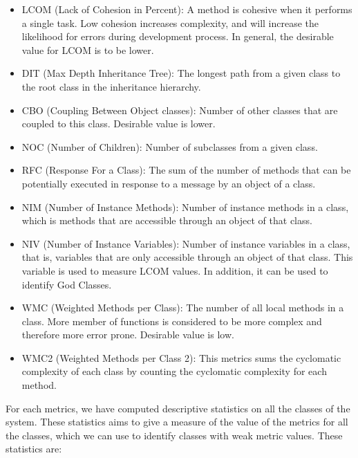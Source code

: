 \begin{itemize}
	\item LCOM (Lack of Cohesion in Percent): A method is cohesive when it performs a single task. Low cohesion increases complexity, and will increase the likelihood for errors during development process. In general, the desirable value for LCOM is to be lower. 

	\item DIT (Max Depth Inheritance Tree): The longest path from a given class to the root class in the inheritance hierarchy.

\item CBO (Coupling Between Object classes): Number of other classes that are coupled to this class. Desirable value is lower. 

\item NOC (Number of Children): Number of subclasses from a given class.

\item RFC (Response For a Class): The sum of the number of methods that can be potentially executed in response to a message by an object of a class.

\item NIM (Number of Instance Methods): Number of instance methods in a class, which is methods that are accessible through an object of that class.

\item NIV (Number of Instance Variables): Number of instance variables in a class, that is, variables that are only accessible through an object of that class. This variable is used to measure LCOM values. In addition, it can be used to identify God Classes.

\item WMC (Weighted Methods per Class): The number of all local methods in a class. More member of functions is considered to be more complex and therefore more error prone. Desirable value is low.

\item WMC2 (Weighted Methods per Class 2): This metrics sums the cyclomatic complexity of each class by counting the cyclomatic complexity for each method.
\end{itemize}


For each metrics, we have computed descriptive statistics on all the classes of the system. These statistics aims to give a measure of the value of the metrics for all the classes, which we can use to identify classes with weak metric values. These statistics are:

